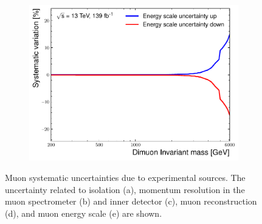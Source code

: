 \begin{figure}[]
\begin{subfigure}[b]{0.42\textwidth}
        \caption{}
        \label{fig:uncert:mmReco}
    \end{subfigure}
    \begin{subfigure}[b]{0.42\textwidth}
        \centering
        \includegraphics[width=\textwidth]{figures/analysis/datamc/Uncertainties/exp/mm/m_uu_pstOR_MUON_SCALE__1up.pdf}
        \caption{}
        \label{fig:uncert:mmScale}
    \end{subfigure}
    \caption[Muon systematic uncertainties due to experimental sources]{Muon systematic uncertainties due to experimental sources. The uncertainty related to isolation (a), momentum resolution in the muon spectrometer (b) and inner detector (c), muon reconstruction (d), and muon energy scale (e) are shown.}
    \label{fig:uncert:mmExp}
\end{figure}

